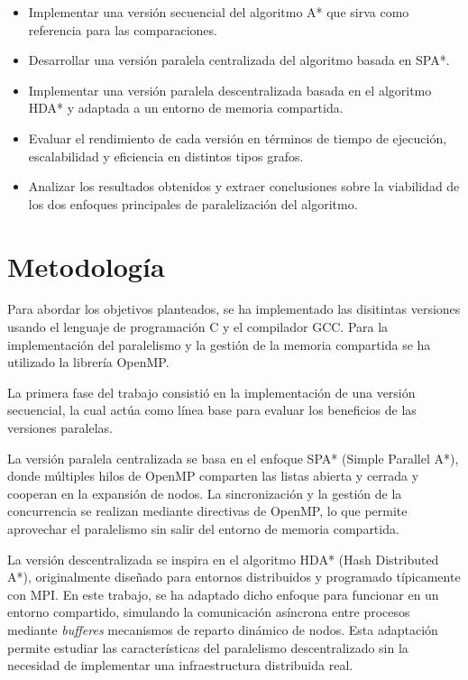 \documentclass[a4paper,12pt]{article}
\begin{document}
\begin{itemize}
\item Implementar una versión secuencial del algoritmo A* que sirva como referencia para las comparaciones.

\item Desarrollar una versión paralela centralizada del algoritmo basada en SPA*.

\item Implementar una versión paralela descentralizada basada en el algoritmo HDA* y adaptada a un entorno de memoria compartida.

\item Evaluar el rendimiento de cada versión en términos de tiempo de ejecución, escalabilidad y eficiencia en distintos tipos grafos.

\item Analizar los resultados obtenidos y extraer conclusiones sobre la viabilidad de los dos enfoques principales de paralelización del algoritmo.
\end{itemize}

\newpage

\section{Metodología} \label{sec:metodologia}

Para abordar los objetivos planteados, se ha implementado las disitintas versiones usando el lenguaje de programación C y el compilador GCC. Para la implementación del paralelismo y la gestión de la memoria compartida se ha utilizado la librería OpenMP.

La primera fase del trabajo consistió en la implementación de una versión secuencial, la cual actúa como línea base para evaluar los beneficios de las versiones paralelas.

La versión paralela centralizada se basa en el enfoque SPA* (Simple Parallel A*), donde múltiples hilos de OpenMP comparten las listas abierta y cerrada y cooperan en la expansión de nodos. La sincronización y la gestión de la concurrencia se realizan mediante directivas de OpenMP, lo que permite aprovechar el paralelismo sin salir del entorno de memoria compartida.

La versión descentralizada se inspira en el algoritmo HDA* (Hash Distributed A*), originalmente diseñado para entornos distribuidos y programado típicamente con MPI. En este trabajo, se ha adaptado dicho enfoque para funcionar en un entorno compartido, simulando la comunicación asíncrona entre procesos mediante \textit{bufferes} mecanismos de reparto dinámico de nodos. Esta adaptación permite estudiar las características del paralelismo descentralizado sin la necesidad de implementar una infraestructura distribuida real.
\end{document}
